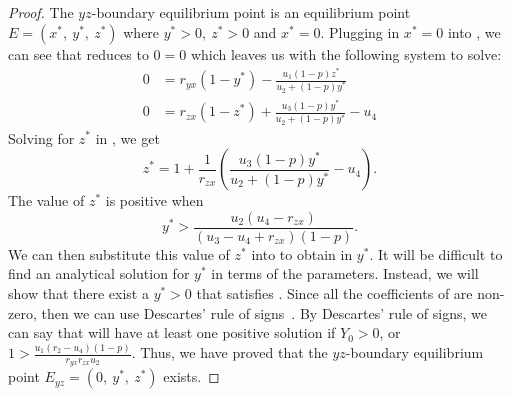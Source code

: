 \begin{proof}
    The $yz$-boundary equilibrium point is an equilibrium point $E=\left(x^*,\ y^*,\ z^*\right)$ where $y^*>0,\ z^*>0$ and $x^*=0$. Plugging in $x^*=0$ into , we can see that  reduces to $0=0$ which leaves us with the following system to solve:
    \begin{subequations}\label{system:yz-boundary}
        \begin{align}
            0 &= r_{yx}\left(1-y^*\right)-\frac{u_1\left(1-p\right)z^*}{u_2+\left(1-p\right)y^*} \label{eq:yz-boundary-y}\\
            0 &= r_{zx}\left(1-z^*\right)+\frac{u_3\left(1-p\right)y^*}{u_2+\left(1-p\right)y^*}-u_4 \label{eq:yz-boundary-z}
        \end{align}
    \end{subequations}
    Solving for $z^*$ in , we get
    \begin{equation*}
        z^*=1+\frac{1}{r_{zx}}\left(\frac{u_3\left(1-p\right)y^*}{u_2+\left(1-p\right)y^*}-u_4\right).
    \end{equation*}
    The value of $z^*$ is positive when
    \begin{equation*}
        y^* > \frac{u_2\left(u_4-r_{zx}\right)}{\left(u_3-u_4+r_{zx}\right)\left(1-p\right)}.
    \end{equation*}
    We can then substitute this value of $z^*$ into  to obtain  in $y^*$. It will be difficult to find an analytical solution for $y^*$ in terms of the parameters. Instead, we will show that there exist a $y^*>0$ that satisfies . Since all the coefficients of  are non-zero, then we can use Descartes' rule of signs~\cite{WANG2004525526}. By Descartes' rule of signs, we can say that  will have at least one positive solution if $Y_0>0$, or $1 > \frac{u_1\left(r_2-u_4\right)\left(1-p\right)}{r_{yx}r_{zx}u_2}$. Thus, we have proved that the $yz$-boundary equilibrium point $E_{yz}=\left(0,\ y^*,\ z^*\right)$ exists.
\end{proof}


